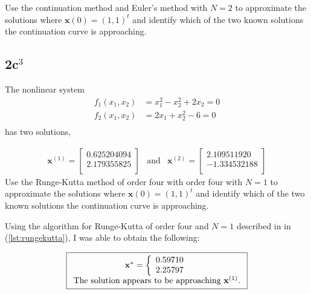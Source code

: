 \documentclass[12pt]{article}
\begin{document}
Use the continuation method and Euler's method with $N=2$ to
approximate the solutions where $\mathbf{x}(0)=(1,1)^t$ and identify
which of the two known solutions the continuation curve is
approaching.

\subsection{2c$^3$}
The nonlinear system
\begin{align*}
  f_1(x_1,x_2)&=x_1^2-x_2^2+2x_2 =0 \\
  f_2(x_1,x_2)&=2x_1+x_2^2-6 =0 \\
\end{align*}
has two solutions,

\begin{equation*}
  \begin{array}{ccc}
    \mathbf{x}^{(1)}=
    \begin{bmatrix}
      0.625204094 \\
      2.179355825 \\
    \end{bmatrix}
    &
    \mathrm{and}
    &
    \mathbf{x}^{(2)}=
    \begin{bmatrix}
      2.109511920 \\
      −1.334532188 \\
    \end{bmatrix}
  \end{array}
\end{equation*}
Use the Runge-Kutta method of order four with order four with $N=1$ to
approximate the solutions where $\mathbf{x}(0)=(1,1)^t$ and identify
which of the two known solutions the continuation curve is
approaching.


Using the algorithm for Runge-Kutta of order four and $N=1$ described in
in~\texttt{} (\cref{lst:rungekutta}), I was able to obtain the following:

\begin{equation*}
  \boxed{
    \begin{array}[h]{cc}
    \mathbf{x}^*= \left\{
      \begin{array}{c}
        0.59710 \\
        2.25797 \\
      \end{array}
    \right.\\
    \text{The solution appears to be approaching }\mathbf{x}^{(1)}\text{.}
  \end{array}
  }
\end{equation*}


\begin{minipage}[h]{1.0\linewidth}
  
\end{minipage}
\end{document}

